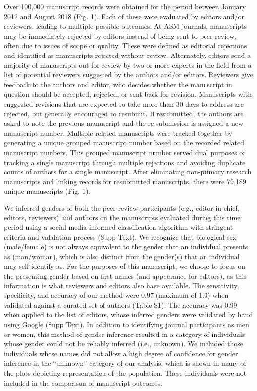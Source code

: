 \documentclass[11pt,]{article}
\begin{document}
Over 100,000 manuscript records were obtained for the period between
January 2012 and August 2018 (Fig. 1). Each of these were evaluated by
editors and/or reviewers, leading to multiple possible outcomes. At ASM
journals, manuscripts may be immediately rejected by editors instead of
being sent to peer review, often due to issues of scope or quality.
These were defined as editorial rejections and identified as manuscripts
rejected without review. Alternately, editors send a majority of
manuscripts out for review by two or more experts in the field from a
list of potential reviewers suggested by the authors and/or editors.
Reviewers give feedback to the authors and editor, who decides whether
the manuscript in question should be accepted, rejected, or sent back
for revision. Manuscripts with suggested revisions that are expected to
take more than 30 days to address are rejected, but generally encouraged
to resubmit. If resubmitted, the authors are asked to note the previous
manuscript and the re-submission is assigned a new manuscript number.
Multiple related manuscripts were tracked together by generating a
unique grouped manuscript number based on the recorded related
manuscript numbers. This grouped manuscript number served dual purposes
of tracking a single manuscript through multiple rejections and avoiding
duplicate counts of authors for a single manuscript. After eliminating
non-primary research manuscripts and linking records for resubmitted
manuscripts, there were 79,189 unique manuscripts (Fig. 1).

We inferred genders of both the peer review participants (e.g.,
editor-in-chief, editors, reviewers) and authors on the manuscripts
evaluated during this time period using a social media-informed
classification algorithm with stringent criteria and validation process
(Supp Text). We recognize that biological sex (male/female) is not
always equivalent to the gender that an individual presents as
(man/woman), which is also distinct from the gender(s) that an
individual may self-identify as. For the purposes of this manuscript, we
choose to focus on the presenting gender based on first names (and
appearance for editors), as this information is what reviewers and
editors also have available. The sensitivity, specificity, and accuracy
of our method were 0.97 (maximum of 1.0) when validated against a
curated set of authors (Table S1). The accuracy was 0.99 when applied to
the list of editors, whose inferred genders were validated by hand using
Google (Supp Text). In addition to identifying journal participants as
men or women, this method of gender inference resulted in a category of
individuals whose gender could not be reliably inferred (i.e., unknown).
We included those individuals whose names did not allow a high degree of
confidence for gender inference in the ``unknown'' category of our
analysis, which is shown in many of the plots depicting representation
of the population. These individuals were not included in the comparison
of manuscript outcomes.
\end{document}
